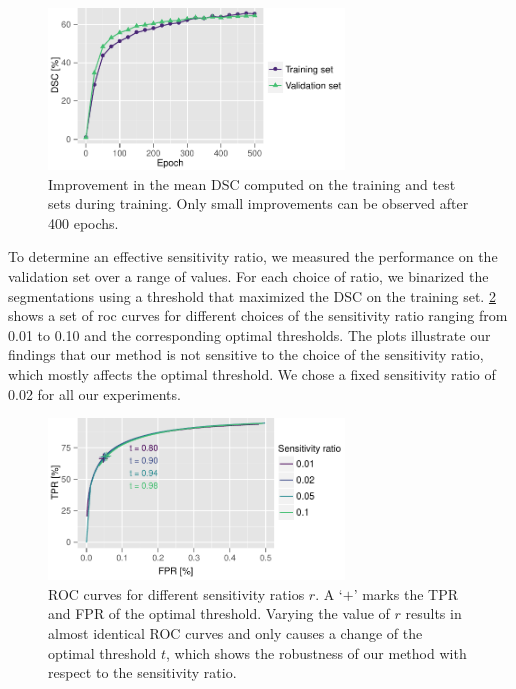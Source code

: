 \begin{figure}[tb]
\centering
\includegraphics[width=0.7\textwidth]{figures/tmi/ems_progress}
\caption[Improvement in the mean DSC computed on the training and test sets
during training]{Improvement in the mean DSC computed on the training and test
sets during training. Only small improvements can be observed after 400 epochs.}
\label{fig:epochs}
\end{figure}

To determine an effective sensitivity ratio, we measured the performance on the
validation set over a range of values. For each choice of ratio, we binarized
the segmentations using a threshold that maximized the DSC on the training set.
\ref{fig:ratio} shows a set of \gls{roc} curves for different choices of the
sensitivity ratio ranging from 0.01 to 0.10 and the corresponding optimal
thresholds. The plots illustrate our findings that our method is not sensitive
to the choice of the sensitivity ratio, which mostly affects the optimal
threshold. We chose a fixed sensitivity ratio of 0.02 for all our experiments.

\begin{figure}[tb]
\centering
\includegraphics[width=0.7\textwidth]{figures/tmi/roc2}
\caption[ROC curves for different sensitivity ratios $r$]{ROC curves for
different sensitivity ratios $r$. A `$+$' marks the TPR and FPR of the optimal
threshold. Varying the value of $r$ results in almost identical ROC curves and
only causes a change of the optimal threshold $t$, which shows the robustness of
our method with respect to the sensitivity ratio.}
\label{fig:ratio}
\end{figure}


